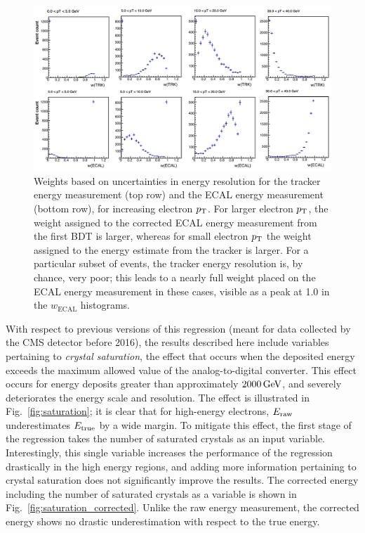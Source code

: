 \begin{figure}[hbtp]
  \begin{center}
    \includegraphics[width=0.99\linewidth]{img/regression/weightplot.pdf}
    \caption{
        Weights based on uncertainties in energy resolution for the tracker energy measurement (top row) and the ECAL energy measurement (bottom row), for increasing electron $p_\mathrm{T}$.
        For larger electron $p_\mathrm{T}$, the weight assigned to the corrected ECAL energy measurement from the first BDT is larger, whereas for small electron $p_\mathrm{T}$ the weight assigned to the energy estimate from the tracker is larger.
        For a particular subset of events, the tracker energy resolution is, by chance, very poor; this leads to a nearly full weight placed on the ECAL energy measurement in these cases, visible as a peak at 1.0 in the $w_\text{ECAL}$ histograms.
        }
    \label{fig:regressionweights}
  \end{center}
\end{figure}


With respect to previous versions of this regression (meant for data collected by the CMS detector before 2016), the results described here include variables pertaining to \textit{crystal saturation}, the effect that occurs when the deposited energy exceeds the maximum allowed value of the analog-to-digital converter.
% 
This effect occurs for energy deposits greater than approximately $2000\,\text{GeV}$, and severely deteriorates the energy scale and resolution.
% 
The effect is illustrated in Fig.~\ref{fig:saturation}; it is clear that for high-energy electrons, $E_\text{raw}$ underestimates $E_\text{true}$ by a wide margin.
% 
To mitigate this effect, the first stage of the regression takes the number of saturated crystals as an input variable.
% 
Interestingly, this single variable increases the performance of the regression drastically in the high energy regions, and adding more information pertaining to crystal saturation does not significantly improve the results.
% 
The corrected energy including the number of saturated crystals as a variable is shown in Fig.~\ref{fig:saturation_corrected}.
% 
Unlike the raw energy measurement, the corrected energy shows no drastic underestimation with respect to the true energy.


